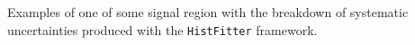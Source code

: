 Examples of one of some signal region with the breakdown of systematic uncertainties  produced with the \texttt{HistFitter} framework.



